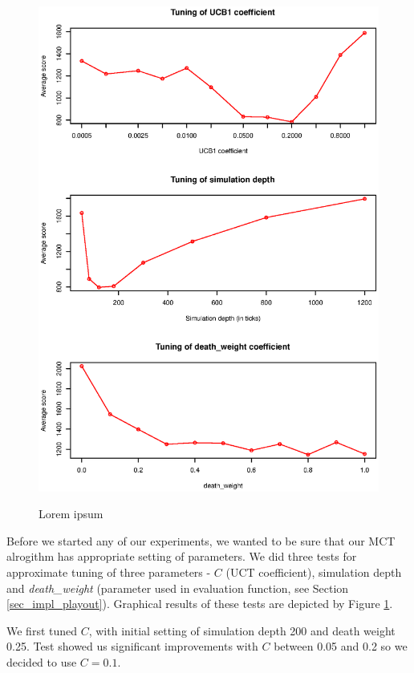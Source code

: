 \begin{figure}
\begin{center}
\includegraphics{img/mcts-tuning.eps}
\end{center}
\caption{\footnotesize Lorem ipsum}{\footnotesize }
\label{fig_mcts_tuning}
\end{figure}

Before we started any of our experiments, we wanted to be sure that our MCT alrogithm has
appropriate setting of parameters. We did three tests for approximate tuning of three
parameters - $C$ (UCT coefficient), simulation depth and \emph{death\_weight} (parameter used in
evaluation function, see Section \ref{sec_impl_playout}). Graphical results of these tests are
depicted by Figure \ref{fig_mcts_tuning}.

We first tuned $C$, with initial setting of simulation depth 200 and death weight 0.25. Test
showed us significant improvements with $C$ between 0.05 and 0.2 so we decided to use $C=0.1$.

